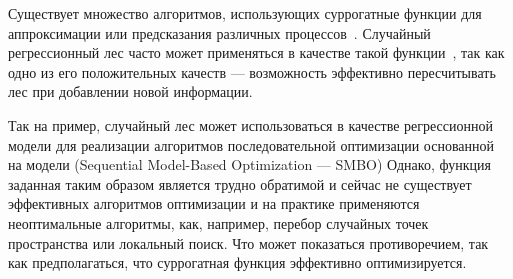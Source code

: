\documentclass[pscyr]{itmo-student-thesis}
\begin{document}





\tableofcontents

\startprefacepage

Существует множество алгоритмов, использующих суррогатные функции для
аппроксимации или предсказания различных процессов~\cite{surrogate}. Случайный
регрессионный лес часто может применяться в качестве такой
функции~\cite{randomsurr}, так как одно из его положительных качеств ---
возможность эффективно пересчитывать лес при добавлении новой информации.

Так на пример, случайный лес может использоваться в качестве регрессионной
модели для реализации алгоритмов последовательной оптимизации основанной на
модели (Sequential Model-Based Optimization --- SMBO\cite{smac}) Однако, функция
заданная таким образом является трудно обратимой и сейчас не существует
эффективных алгоритмов оптимизации и на практике применяются неоптимальные
алгоритмы, как, например, перебор случайных точек пространства или локальный
поиск. Что может показаться противоречием, так как предполагаться, что
суррогатная функция эффективно оптимизируется.
\end{document}
